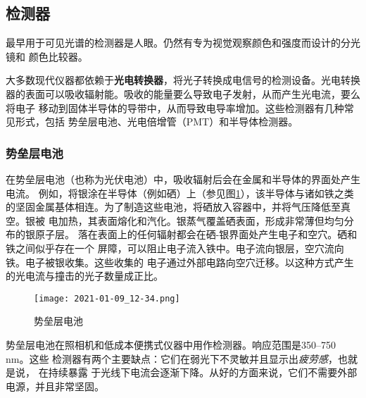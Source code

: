 \subsection{检测器}
最早用于可见光谱的检测器是人眼。仍然有专为视觉观察颜色和强度而设计的分光镜和
颜色比较器。

大多数现代仪器都依赖于{\bf 光电转换器}，将光子转换成电信号的检测设备。光电转换
器的表面可以吸收辐射能。吸收的能量要么导致电子发射，从而产生光电流，要么将电子
移动到固体半导体的导带中，从而导致电导率增加。这些检测器有几种常见形式，包括
势垒层电池、光电倍增管（PMT）和半导体检测器。
\subsubsection{势垒层电池}
在势垒层电池（也称为光伏电池）中，吸收辐射后会在金属和半导体的界面处产生电流。
例如，将银涂在半导体（例如硒）上（参见图\ref{fig:5.17}），该半导体与诸如铁之类
的坚固金属基体相连。为了制造这些电池，将硒放入容器中，并将气压降低至真空。银被
电加热，其表面熔化和汽化。银蒸气覆盖硒表面，形成非常薄但均匀分布的银原子层。
落在表面上的任何辐射都会在硒-银界面处产生电子和空穴。硒和铁之间似乎存在一个
屏障，可以阻止电子流入铁中。电子流向银层，空穴流向铁。电子被银收集。这些收集的
电子通过外部电路向空穴迁移。以这种方式产生的光电流与撞击的光子数量成正比。
\begin{figure}[htpb]
    \centering
    \texttt{[image: 2021-01-09\_12-34.png]}
    \caption{势垒层电池}
    \label{fig:5.17}
\end{figure}

势垒层电池在照相机和低成本便携式仪器中用作检测器。响应范围是350--750 nm。这些
检测器有两个主要缺点：它们在弱光下不灵敏并且显示出\emph{疲劳感}，也就是说，
在持续暴露
于光线下电流会逐渐下降。从好的方面来说，它们不需要外部电源，并且非常坚固。
